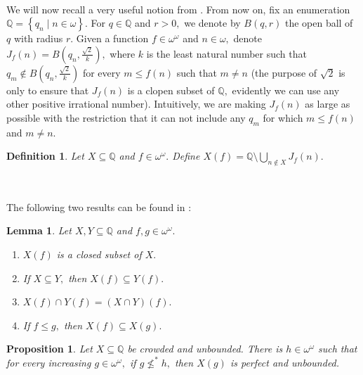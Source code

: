 \documentclass{article}%
\newtheorem{definition}[theorem]{Definition}
\newtheorem{lemma}[theorem]{Lemma}
\newtheorem{proposition}[theorem]{Proposition}
\begin{document}
\qquad\ \ 

We will now recall a very useful notion from \cite{GruffUltrafilters}. From
now on, fix an enumeration $\mathbb{Q}=\left\{  q_{n}\mid n\in\omega\right\}
$. For $q\in\mathbb{Q}$ and $r>0,$ we denote by $B\left(  q,r\right)  $ the
open ball of $q$ with radius $r.$ Given a function $f\in\omega^{\omega}$ and
$n\in\omega,$ denote $J_{f}\left(  n\right)  =B(q_{n},\frac{\sqrt{2}}{k}),$
where $k$ is the least natural number such that $q_{m}\notin B(q_{n}%
,\frac{\sqrt{2}}{k})$ for every $m\leq f\left(  n\right)  $ such that $m\neq
n$ (the purpose of $\sqrt{2}$ is only to ensure that $J_{f}\left(  n\right)  $
is a clopen subset of $\mathbb{Q},$ evidently we can use any other positive
irrational number). Intuitively, we are making $J_{f}\left(  n\right)  $ as
large as possible with the restriction that it can not include any $q_{m}$ for
which $m\leq f\left(  n\right)  $ and $m\neq n.$

\begin{definition}
Let $X\subseteq\mathbb{Q}$ and $f\in\omega^{\omega}.$ Define $X\left(
f\right)  =\mathbb{Q\setminus}%
{\textstyle\bigcup\limits_{n\notin X}}
J_{f}\left(  n\right)  .$
\end{definition}

\qquad\qquad\ \ 

The following two results can be found in \cite{GruffUltrafilters}:

\begin{lemma}
Let $X,Y\subseteq\mathbb{Q}$ and $f,g\in\omega^{\omega}.$

\begin{enumerate}
\item $X\left(  f\right)  $ is a closed subset of $X.$

\item If $X\subseteq Y,$ then $X\left(  f\right)  \subseteq Y\left(  f\right)
.$

\item $X\left(  f\right)  \cap Y\left(  f\right)  =\left(  X\cap Y\right)
\left(  f\right)  .$

\item If $f\leq g,$ then $X\left(  f\right)  \subseteq X\left(  g\right)  .$
\end{enumerate}
\end{lemma}

\begin{proposition}
Let $X\subseteq\mathbb{Q}$ be crowded and unbounded. There is $h\in
\omega^{\omega}$ such that for every increasing $g\in\omega^{\omega},$ if
$g\nleq^{\ast}h,$ then $X\left(  g\right)  $ is perfect and unbounded.
\label{Prop David Michael}
\end{proposition}
\end{document}
